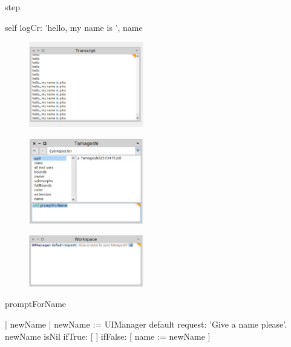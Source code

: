 \documentclass[a4paper,10pt,twoside]{book}
\begin{document}
\begin{code}{}
step

	self logCr: 'hello, my name is ', name
\end{code}


\begin{figure}
\begin{center}
\includegraphics[width=5cm]{figures/helloWithPika}
\caption{\label{fig:tomastate}}
\end{center}
\end{figure}

\begin{figure}
\begin{center}
\includegraphics[width=5cm]{figures/inspectorWithFifiPrompt}
\caption{\label{fig:tomastate}}
\end{center}
\end{figure}




\begin{figure}
\begin{center}
\includegraphics[width=5cm]{figures/promptWithNil}
\caption{\label{fig:tomastate}}
\end{center}
\end{figure}


\begin{code}{}
promptForName

	| newName |
	newName := UIManager default request: 'Give a name please'.
	newName isNil 
		ifTrue: [ ]
		ifFalse: [ name := newName ]
\end{code}
\end{document}
